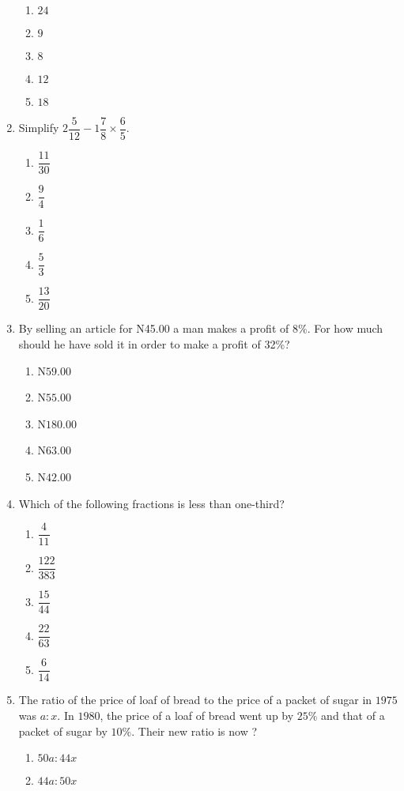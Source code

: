 \begin{multicols}{2}
\begin{enumerate}[label={\arabic*.}]
\begin{enumerate}[label={\Alph*.}]
    \item \(24\)
    \item \(9\)
    \item \(8\)
    \item \(12\)
    \item \(18\)
    \end{enumerate}
\item Simplify \(2{\dfrac{5}{12}} - 1{\dfrac{7}{8}} \times \dfrac{6}{5}\).
    \begin{enumerate}[label={\Alph*.}]
    \item \(\dfrac{11}{30}\)
    \item \(\dfrac{9}{4}\)
    \item \(\dfrac{1}{6}\)
    \item \(\dfrac{5}{3}\)
    \item \(\dfrac{13}{20}\)
    \end{enumerate}
\item By selling an article for N45.00 a man makes a profit of \(8\%\). For how much should he have sold it in order to make a profit of 32\%? 
    \begin{enumerate}[label={\Alph*.}]
    \item N\(59.00\)
    \item N\(55.00\)
    \item N\(180.00\)
    \item N\(63.00\)
    \item N\(42.00\)
    \end{enumerate}
\item Which of the following fractions is less than one-third?
    \begin{enumerate}[label={\Alph*.}]
    \item \(\dfrac{4}{11}\)
    \item \(\dfrac{122}{383}\)
    \item \(\dfrac{15}{44}\)
    \item \(\dfrac{22}{63}\)
    \item \(\dfrac{6}{14}\)
    \end{enumerate}
\item The ratio of the price of loaf of bread to the price of a packet of sugar in \(1975\) was \(a:x\). In \(1980\), the price of a loaf of bread went up by \(25\%\) and that of a packet of sugar by \(10\%\). Their new ratio is now ?
    \begin{enumerate}[label={\Alph*.}]
    \item \(50a:44x\)
    \item \(44a:50x\)

\end{enumerate}
\end{enumerate}
\end{multicols}
